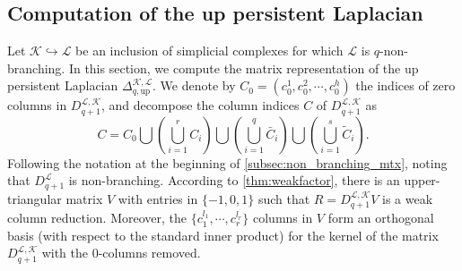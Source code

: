 \documentclass{article}
\theoremstyle{definition}
\newcommand{\KK}{\mathcal{K}}
\newcommand{\LL}{\mathcal{L}}
\begin{document}
\subsection{Computation of the up persistent Laplacian}\label{subsec:regular_form}
Let $\KK\hookrightarrow \LL$ be an inclusion of simplicial complexes for which $\LL$ is $q$-non-branching.
In this section, 
we compute the matrix representation of the up persistent Laplacian $\Delta_{q, \textrm{up}}^{\KK, \LL}$.
We denote by $C_0=(c_0^1, c_0^2, \cdots, c_0^h)$ the indices of zero columns in $D_{q+1}^{\LL, \KK}$,
and decompose the column indices $C$ of $D_{q+1}^{\LL, \KK}$ as
\begin{equation}
\label{eq:decomp}
C = C_0 \bigcup
\left(\bigcup_{i=1}^r C_i\right) \bigcup 
\left(\bigcup_{i=1}^q \bar{C}_i\right)\bigcup \left(\bigcup_{i=1}^s \widetilde{C}_i\right).
\end{equation}
Following the notation at the beginning of \cref{subsec:non_branching_mtx}, noting that $D_{q+1}^{\LL}$ is non-branching. According to \cref{thm:weakfactor},
there is an upper-triangular matrix $V$ with entries in $\{-1, 0, 1\}$ such that $R=D_{q+1}^{\LL, \KK} V$ is a weak column reduction.
Moreover,
the $\{c_{1}^{l_1}, \cdots, c_r^{l_r}\}$ columns in $V$ form an orthogonal basis (with respect to the standard inner product) for the kernel of the matrix $D_{q+1}^{\LL, \KK}$ with the 0-columns removed.
\end{document}
